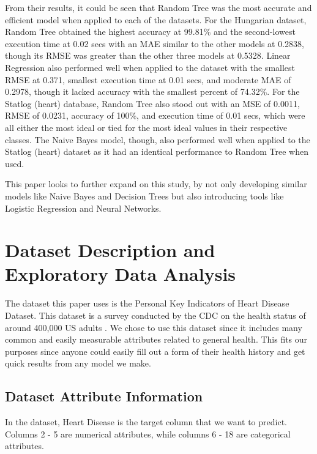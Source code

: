 \documentclass[a4paper]{article}
\begin{document}
From their results, it could be seen that Random Tree was the most accurate and efficient model when applied to each of the datasets. For the Hungarian dataset, Random Tree obtained the highest accuracy at 99.81\% and the second-lowest execution time at 0.02 secs with an MAE similar to the other models at 0.2838, though its RMSE was greater than the other three models at 0.5328. Linear Regression also performed well when applied to the dataset with the smallest RMSE at 0.371, smallest execution time at 0.01 secs, and moderate MAE of 0.2978, though it lacked accuracy with the smallest percent of 74.32\%. For the Statlog (heart) database, Random Tree also stood out with an MSE of 0.0011, RMSE of 0.0231, accuracy of 100\%, and execution time of 0.01 secs, which were all either the most ideal or tied for the most ideal values in their respective classes. The Naive Bayes model, though, also performed well when applied to the Statlog (heart) dataset as it had an identical performance to Random Tree when used.   

This paper looks to further expand on this study, by not only developing similar models like Naive Bayes and Decision Trees but also introducing tools like Logistic Regression and Neural Networks. 


\section{Dataset Description and Exploratory Data Analysis}

The dataset this paper uses is the Personal Key Indicators of Heart Disease Dataset. This dataset is a survey conducted by the CDC on the health status of around 400,000 US adults \cite{dataset}. We chose to use this dataset since it includes many common and easily measurable attributes related to general health. This fits our purposes since anyone could easily fill out a form of their health history and get quick results from any model we make.

\subsection{Dataset Attribute Information}

In the dataset, Heart Disease is the target column that we want to predict. Columns 2 - 5 are numerical attributes, while columns 6 - 18 are categorical attributes.
\end{document}
